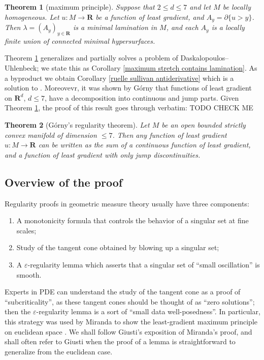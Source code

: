 \documentclass[reqno,12pt,letterpaper]{amsart}
\newcommand{\RR}{\mathbf{R}}
\newtheorem{theorem}{Theorem}[section]
\theoremstyle{definition}
\numberwithin{equation}{section}
\begin{document}
\begin{theorem}[maximum principle]\label{main thm}
Suppose that $2 \leq d \leq 7$ and let $M$ be locally homogeneous.
Let $u: M \to \RR$ be a function of least gradient, and $A_y = \partial \{u > y\}$.
Then $\lambda = (A_y)_{y \in \RR}$ is a minimal lamination in $M$, and each $A_y$ is a locally finite union of connected minimal hypersurfaces.
\end{theorem}

Theorem \ref{main thm} generalizes \cite[Proposition 3.4]{górny2017planar} and partially solves a problem \cite[Problem 9.5]{daskalopoulos2020transverse} of Daskalopoulos--Uhlenbeck; we state this as Corollary \ref{maximum stretch contains lamination}.
As a byproduct we obtain Corollary \ref{ruelle sullivan antiderivative} which is a solution to \cite[Problem 9.7]{daskalopoulos2020transverse}.
Moreovevr, it was shown by G\'orny \cite[Theorem 1.2]{górny2017planar} that functions of least gradient on $\RR^d$, $d \leq 7$, have a decomposition into continuous and jump parts.
Given Theorem \ref{main thm}, the proof of this result goes through verbatim: TODO CHECK ME

\begin{theorem}[G\'orny's regularity theorem]\label{Gorny regularity}
Let $M$ be an open bounded strictly convex manifold of dimension $\leq 7$.
Then any function of least gradient $u: M \to \RR$ can be written as the sum of a continuous function of least gradient, and a function of least gradient with only jump discontinuities.
\end{theorem}

\subsection{Overview of the proof}
Regularity proofs in geometric measure theory usually have three components:
\begin{enumerate}
\item A monotonicity formula that controls the behavior of a singular set at fine scales;
\item Study of the tangent cone obtained by blowing up a singular set;
\item A $\varepsilon$-regularity lemma which asserts that a singular set of ``small oscillation'' is smooth.
\end{enumerate}
Experts in PDE can understand the study of the tangent cone as a proof of ``subcriticality'', as these tangent cones should be thought of as ``zero solutions''; then the $\varepsilon$-regularity lemma is a sort of ``small data well-posedness''.
In particular, this strategy was used by Miranda to show the least-gradient maximum principle on euclidean space \cite{Miranda64, Miranda66, Miranda67}.
We shall follow Giusti's exposition \cite{Giusti77} of Miranda's proof, and shall often refer to Giusti when the proof of a lemma is straightforward to generalize from the euclidean case.
\end{document}
